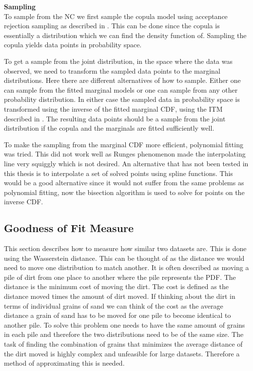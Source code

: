 \textbf{Sampling}\\
To sample from the \gls{NC} we first sample the copula model using acceptance rejection sampling as described in . This can be done since the copula is essentially a distribution which we can find the density function of. Sampling the copula yields data points in probability space. 

To get a sample from the joint distribution, in the space where the data was observed, we need to transform the sampled data points to the marginal distributions. Here there are different alternatives of how to sample. Either one can sample from the fitted marginal models or one can sample from any other probability distribution. In either case the sampled data in probability space is transformed using the inverse of the fitted marginal \gls{CDF}, using the \gls{ITM} described in . The resulting data points should be a sample from the joint distribution if the copula and the marginals are fitted sufficiently well. 

\begin{remark}
     To make the sampling from the marginal \gls{CDF} more efficient, polynomial fitting was tried. This did not work well as Runges phenomenon made the interpolating line very squiggly which is not desired. An alternative that has not been tested in this thesis is to interpolate a set of solved points using spline functions. This would be a good alternative since it would not suffer from the same problems as polynomial fitting, now the bisection algorithm is used to solve for points on the inverse \gls{CDF}.   
\end{remark}



\subsection{Goodness of Fit Measure}\label{sec:GoodnessOfFit}
This section describes how to measure how similar two datasets are. This is done using the Wasserstein distance. This can be thought of as the distance we would need to move one distribution to match another. It is often described as moving a pile of dirt from one place to another where the pile represents the \gls{PDF}. The distance is the minimum cost of moving the dirt. The cost is defined as the distance moved times the amount of dirt moved. If thinking about the dirt in terms of individual grains of sand we can think of the cost as the average distance a grain of sand has to be moved for one pile to become identical to another pile. To solve this problem one needs to have the same amount of grains in each pile and therefore the two distributions need to be of the same size. The task of finding the combination of grains that minimizes the average distance of the dirt moved is highly complex and unfeasible for large datasets. Therefore a method of approximating this is needed. 

